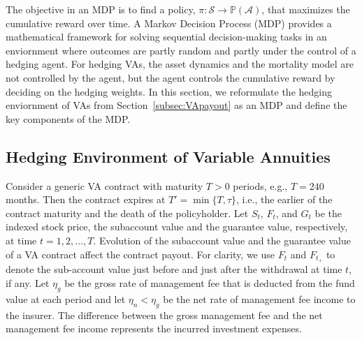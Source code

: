 The objective in an MDP is to find a policy, $\pi: \mathcal{S} \rightarrow \mathbb{P}(\mathcal{A})$, that maximizes the cumulative reward over time.
A Markov Decision Process (MDP) provides a mathematical framework for solving sequential decision-making tasks in an enviornment where outcomes are partly random and partly under the control of a hedging agent. 
For hedging VAs, the asset dynamics and the mortality model are not controlled by the agent, but the agent controls the cumulative reward by deciding on the hedging weights.
In this section, we reformulate the hedging enviornment of VAs from Section~\ref{subsec:VApayout} as an MDP and define the key components of the MDP.

\subsection{Hedging Environment of Variable Annuities} \label{subsec:VASimulation}

Consider a generic VA contract with maturity $T>0$ periods, e.g., $T=240$ months.
Then the contract expires at $T'=\min\{T,\tau\}$, i.e., the earlier of the contract maturity and the death of the policyholder.
Let $S_t$, $F_t$, and $G_t$ be the indexed stock price, the subaccount value and the guarantee value, respectively, at time $t=1,2,\ldots,T$.
Evolution of the subaccount value and the guarantee value of a VA contract affect the contract payout.
For clarity, we use $F_t$ and $F_{t_+}$ to denote the sub-account value just before and just after the withdrawal at time $t$, if any.
Let $\eta_g$ be the gross rate of management fee that is deducted from the fund value at each period and let $\eta_n < \eta_g$ be the net rate of management fee income to the insurer.
The difference between the gross management fee and the net management fee income represents the incurred investment expenses.

